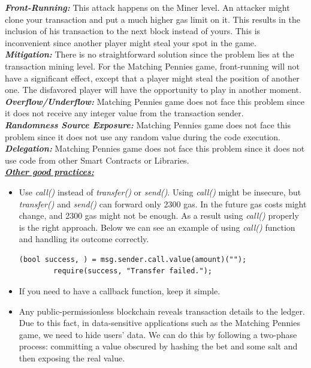 \documentclass[12pt,a4paper]{article}
\begin{document}
\textbf{\emph{Front-Running: }}This attack happens on the Miner level. An attacker might clone your transaction
and put a much higher gas limit on it. This results in the inclusion of his transaction to the
next block instead of yours. This is inconvenient since another player might steal your spot in the game. \\

\textbf{\emph{Mitigation: }}There is no straightforward solution since the problem lies at the transaction mining level.
For the Matching Pennies game, front-running will not have a significant effect, except that a player
might steal the position of another one. The disfavored player will have the opportunity to play in another moment. \\

\textbf{\emph{Overflow/Underflow: }}Matching Pennies game does not face this problem since it does not receive any integer
value from the transaction sender. \\

\textbf{\emph{Randomness Source Exposure: }}Matching Pennies game does not face this problem since it does not use any
random value during the code execution. \\

\textbf{\emph{Delegation: }}Matching Pennies game does not face this problem since it does not use code
from other Smart Contracts or Libraries. \\

\textbf{\emph{\underline{Other good practices:}}} \\ 

\begin{itemize}
    \item Use \emph{call()} instead of \emph{transfer()} or \emph{send()}.
    Using \emph{call()}  might be insecure, but \emph{transfer()} and \emph{send()} can forward only 2300 gas. In the future 
    gas costs might change, and 2300 gas might not be enough. As a result using \emph{call()} properly is the right approach.
    Below we can see an example of using \emph{call()} function and handling its outcome correctly.\\
    \begin{lstlisting}[language=Solidity]
        (bool success, ) = msg.sender.call.value(amount)(""); 
        require(success, "Transfer failed.");
    \end{lstlisting}
    \item If you need to have a callback function, keep it simple.
    \item Any public-permissionless blockchain reveals transaction details to 
    the ledger. Due to this fact, in data-sensitive applications such as the
    Matching Pennies game, we need to hide users' data. We can do this by following a
    two-phase process: committing a value obscured by hashing the bet and some salt
    and then exposing the real value.
\end{itemize}
\end{document}

